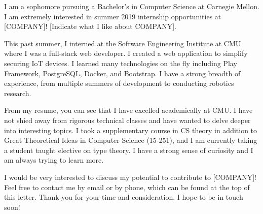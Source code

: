 \documentclass[11pt,stdletter,dateno,sigleft]{newlfm} %
\begin{document}
\begin{newlfm}


I am a sophomore pursuing a Bachelor's in Computer Science at Carnegie Mellon. I
am extremely interested in summer 2019 internship opportunities at [COMPANY]!
[Indicate what I like about COMPANY].

This past summer, I interned at the Software Engineering Institute at CMU where
I was a full-stack web developer. I created a web application to simplify
securing IoT devices. I learned many technologies on the fly including Play
Framework, PostgreSQL, Docker, and Bootstrap. I have a strong breadth of
experience, from multiple summers of development to conducting robotics
research.

From my resume, you can see that I have excelled academically at CMU. I have not
shied away from rigorous technical classes and have wanted to delve deeper into
interesting topics. I took a supplementary course in CS theory in addition to
Great Theoretical Ideas in Computer Science (15-251), and I am currently taking
a student taught elective on type theory. I have a strong sense of curiosity and
I am always trying to learn more.

I would be very interested to discuss my potential to contribute to
[COMPANY]! Feel free to contact me by email or by phone, which can be
found at the top of this letter. Thank you for your time and consideration. I
hope to be in touch soon!


\end{newlfm}
\end{document}
